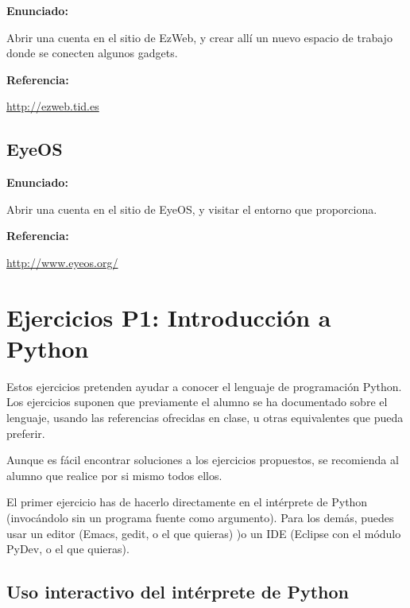 \textbf{Enunciado:}

Abrir una cuenta en el sitio de EzWeb, y crear allí un nuevo espacio de trabajo donde se conecten algunos gadgets.

\textbf{Referencia:}

\url{http://ezweb.tid.es}

\subsection{EyeOS}
\label{subsec:eyeos}

\textbf{Enunciado:}

Abrir una cuenta en el sitio de EyeOS, y visitar el entorno que proporciona.

\textbf{Referencia:}

\url{http://www.eyeos.org/}

\section{Ejercicios P1: Introducción a Python}

Estos ejercicios pretenden ayudar a conocer el lenguaje de programación Python. Los ejercicios suponen que previamente el alumno se ha documentado sobre el lenguaje, usando las referencias ofrecidas en clase, u otras equivalentes que pueda preferir.

Aunque es fácil encontrar soluciones a los ejercicios propuestos, se recomienda al alumno que realice por si mismo todos ellos.

El primer ejercicio has de hacerlo directamente en el intérprete de Python (invocándolo sin un  programa fuente como argumento). Para los demás, puedes usar un editor (Emacs, gedit, o el que quieras) )o un IDE (Eclipse con el módulo PyDev, o el que quieras).

\subsection{Uso interactivo del intérprete de Python}
\label{subsec:practicas-interprete}

